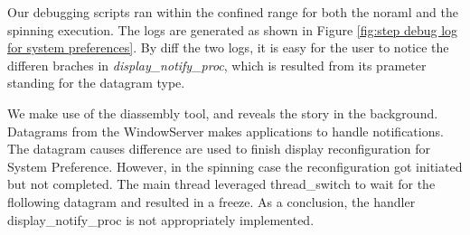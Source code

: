 Our debugging scripts ran within the confined range for both the noraml and the spinning execution.
The logs are generated as shown in Figure \ref{fig:step debug log for system preferences}.
By diff the two logs, it is easy for the user to notice the differen braches in \textit{display\_notify\_proc},
which is resulted from its prameter standing for the datagram type.

We make use of the diassembly tool, and reveals the story in the background.
Datagrams from the WindowServer makes applications to handle notifications.
The datagram causes difference are used to finish display reconfiguration for System Preference.
However, in the spinning case the reconfiguration got initiated but not completed.
The main thread leveraged thread\_switch to wait for the flollowing datagram and resulted in a freeze.
As a conclusion, the handler display\_notify\_proc is not appropriately implemented.
